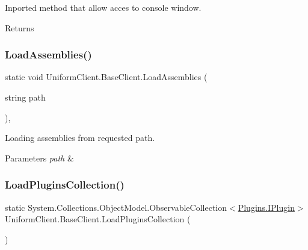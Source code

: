 Inported method that allow acces to console window. 

\begin{DoxyReturn}{Returns}

\end{DoxyReturn}
\mbox{\label{class_uniform_client_1_1_base_client_a8abbd1d46cc50556eeae8bbd55ce680f}} 
\subsubsection{\texorpdfstring{Load\+Assemblies()}{LoadAssemblies()}}
{\footnotesize\ttfamily static void Uniform\+Client.\+Base\+Client.\+Load\+Assemblies (\begin{DoxyParamCaption}\item[{string}]{path }\end{DoxyParamCaption})\hspace{0.3cm}{\ttfamily [static]}, {\ttfamily [protected]}}



Loading assemblies from requested path. 


\begin{DoxyParams}{Parameters}
{\em path} & \\
\hline
\end{DoxyParams}
\mbox{\label{class_uniform_client_1_1_base_client_a99ae0bb1dd5bef374fcedb3f873bfe8b}} 
\subsubsection{\texorpdfstring{Load\+Plugins\+Collection()}{LoadPluginsCollection()}}
{\footnotesize\ttfamily static System.\+Collections.\+Object\+Model.\+Observable\+Collection$<$\mbox{\hyperlink{interface_uniform_client_1_1_plugins_1_1_i_plugin}{Plugins.\+I\+Plugin}}$>$ Uniform\+Client.\+Base\+Client.\+Load\+Plugins\+Collection (\begin{DoxyParamCaption}{ }\end{DoxyParamCaption})\hspace{0.3cm}{\ttfamily [static]}}



